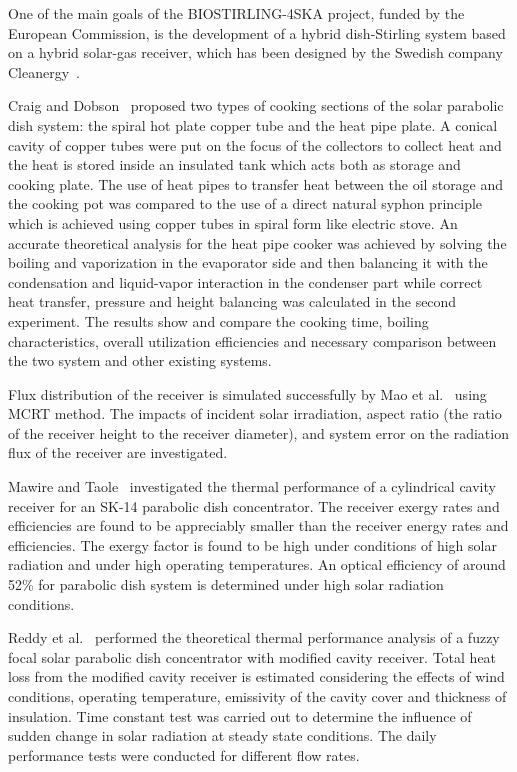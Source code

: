 One of the main goals of the BIOSTIRLING-4SKA project, funded by the European Commission, is the development of a hybrid dish-Stirling system based on a hybrid solar-gas receiver, which has been designed by the Swedish company Cleanergy~\cite{Blazquez2016}.

Craig and Dobson~\cite{Craig2016b} proposed two types of cooking sections of the solar parabolic dish system: the spiral hot plate copper tube and the heat pipe plate. A conical cavity of copper tubes were put on the focus of the collectors to collect heat and the heat is stored inside an insulated tank which acts both as storage and cooking plate. The use of heat pipes to transfer heat between the oil storage and the cooking pot was compared to the use of a direct natural syphon principle which is achieved using copper tubes in spiral form like electric stove. An accurate theoretical analysis for the heat pipe cooker was achieved by solving the boiling and vaporization in the evaporator side and then balancing it with the condensation and liquid-vapor interaction in the condenser part while correct heat transfer, pressure and height balancing was calculated in the second experiment. The results show and compare the cooking time, boiling characteristics, overall utilization efficiencies and necessary comparison between the two system and other existing systems.

Flux distribution of the receiver is simulated successfully by Mao et al.~\cite{Mao2014b} using MCRT method. The impacts of incident solar irradiation, aspect ratio (the ratio of the receiver height to the receiver diameter), and system error on the radiation flux of the receiver are investigated.

Mawire and Taole~\cite{Mawire2014} investigated the thermal performance of a cylindrical cavity receiver for an SK-14 parabolic dish concentrator. The receiver exergy rates and efficiencies are found to be appreciably smaller than the receiver energy rates and efficiencies. The exergy factor is found to be high under conditions of high solar radiation and under high operating temperatures. An optical efficiency of around 52\% for parabolic dish system is determined under high solar radiation conditions.

Reddy et al.~\cite{Reddy2015,Reddy2015_2} performed the theoretical thermal performance analysis of a fuzzy focal solar parabolic dish concentrator with modified cavity receiver. Total heat loss from the modified cavity receiver is estimated considering the effects of wind conditions, operating temperature, emissivity of the cavity cover and thickness of insulation. Time constant test was carried out to determine the influence of sudden change in solar radiation at steady state conditions. The daily performance tests were conducted for different flow rates.

